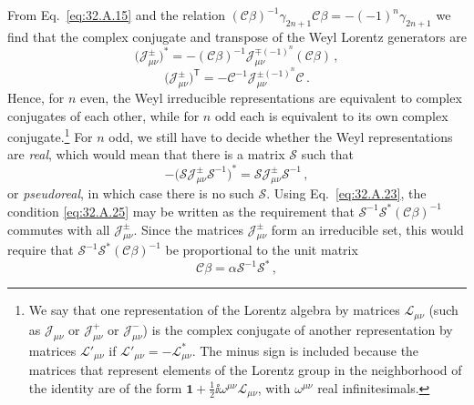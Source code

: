 From Eq.~\eqref{eq:32.A.15} and the relation
\((\mathcal C\beta)^{-1}\gamma_{2n+1}\mathcal C\beta
=-(-1)^n\gamma_{2n+1}\) we find that the complex conjugate and transpose
of the Weyl Lorentz generators are
\begin{equation}
  \bigl(\mathcal J_{\mu\nu}^{\pm}\bigr)^*
  =-(\mathcal C\beta)^{-1}
    \mathcal J_{\mu\nu}^{\mp(-1)^n}
    (\mathcal C\beta)\,,
  \tag{32.A.23}\label{eq:32.A.23}
\end{equation}
\begin{equation}
  \bigl(\mathcal J_{\mu\nu}^{\pm}\bigr)^{\mathsf T}
  =-\mathcal C^{-1}\mathcal J_{\mu\nu}^{\pm(-1)^n}\mathcal C\,.
  \tag{32.A.24}\label{eq:32.A.24}
\end{equation}
Hence, for \(n\) even, the Weyl irreducible representations are equivalent
to complex conjugates of each other, while for \(n\) odd each is equivalent
to its own complex conjugate.\footnote{We say that one representation of
the Lorentz algebra by matrices \(\mathcal L_{\mu\nu}\) (such as
\(\mathcal J_{\mu\nu}\) or \(\mathcal J_{\mu\nu}^+\) or
\(\mathcal J_{\mu\nu}^-\)) is the complex conjugate of another
representation by matrices \(\mathcal L'_{\mu\nu}\) if
\(\mathcal L'_{\mu\nu}=-\mathcal L_{\mu\nu}^*\). The minus sign is included
because the matrices that represent elements of the Lorentz group in the
neighborhood of the identity are of the form
\(\mathbf{1}+\frac{1}{2}\ii\omega^{\mu\nu}\mathcal L_{\mu\nu}\), with
\(\omega^{\mu\nu}\) real infinitesimals.} For \(n\) odd, we still have to
decide whether the Weyl representations are \textit{real}, which would mean
that there is a matrix \(\mathcal S\) such that
\begin{equation}
  -\bigl(\mathcal S\mathcal J_{\mu\nu}^{\pm}\mathcal S^{-1}\bigr)^*
  =\mathcal S\mathcal J_{\mu\nu}^{\pm}\mathcal S^{-1}\,,
  \tag{32.A.25}\label{eq:32.A.25}
\end{equation}
or \textit{pseudoreal}, in which case there is no such \(\mathcal S\).
Using Eq.~\eqref{eq:32.A.23}, the condition \eqref{eq:32.A.25} may be
written as the requirement that
\(\mathcal S^{-1}\mathcal S^*(\mathcal C\beta)^{-1}\) commutes with all
\(\mathcal J_{\mu\nu}^{\pm}\). Since the matrices
\(\mathcal J_{\mu\nu}^{\pm}\) form an irreducible set, this would require
that \(\mathcal S^{-1}\mathcal S^*(\mathcal C\beta)^{-1}\) be proportional
to the unit matrix
\begin{equation}
  \mathcal C\beta=\alpha\mathcal S^{-1}\mathcal S^*\,,
  \tag{32.A.26}\label{eq:32.A.26}
\end{equation}
